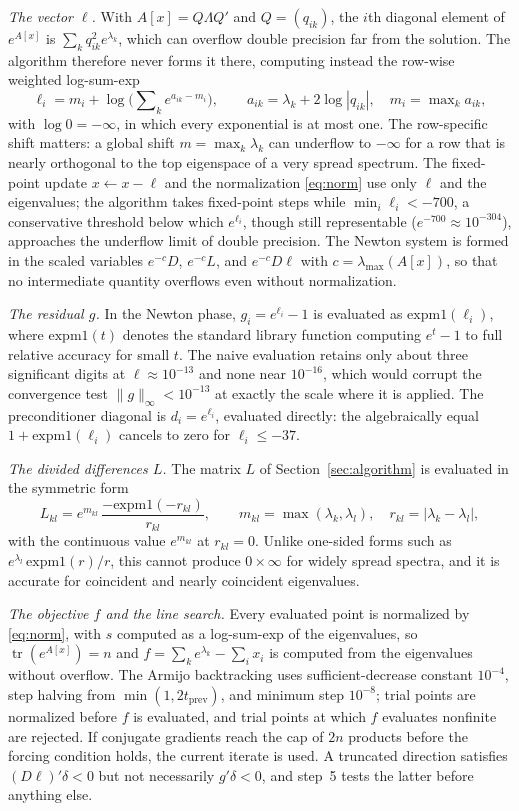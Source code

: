 \documentclass[11pt]{article}
\newcommand{\tr}{\operatorname{tr}}
\begin{document}
\emph{The vector $\ell$.} With $A[x]=Q\Lambda Q'$ and $Q=(q_{ik})$,
the $i$th diagonal element of $e^{A[x]}$ is
$\sum_k q_{ik}^{2}e^{\lambda_k}$, which can overflow double precision
far from the solution. The algorithm therefore never forms it there,
computing instead the row-wise weighted log-sum-exp
\[
\ell_i=m_i+\log\Big(\sum\nolimits_k e^{a_{ik}-m_i}\Big),
\qquad
a_{ik}=\lambda_k+2\log|q_{ik}|,
\quad m_i=\max\nolimits_k a_{ik},
\]
with $\log0=-\infty$, in which every exponential is at most one. The
row-specific shift matters: a global shift $m=\max_k\lambda_k$ can
underflow to $-\infty$ for a row that is nearly orthogonal to the top
eigenspace of a very spread spectrum. The fixed-point update
$x\leftarrow x-\ell$ and the normalization \eqref{eq:norm} use only
$\ell$ and the eigenvalues; the algorithm takes fixed-point steps
while $\min_i\ell_i<-700$, a conservative threshold below which
$e^{\ell_i}$, though still representable
($e^{-700}\approx10^{-304}$), approaches the underflow limit of
double precision. The Newton system is formed in the scaled variables
$e^{-c}D$, $e^{-c}L$, and $e^{-c}D\ell$ with $c=\lambda_{\max}(A[x])$,
so that no intermediate quantity overflows even without
normalization.

\emph{The residual $g$.} In the Newton phase,
$g_i=e^{\ell_i}-1$ is evaluated as $\mathrm{expm1}(\ell_i)$, where
$\mathrm{expm1}(t)$ denotes the standard library function computing
$e^{t}-1$ to full relative accuracy for small $t$. The naive
evaluation retains only about three significant digits at
$\ell\approx10^{-13}$ and none near $10^{-16}$, which would
corrupt the convergence test
$\|g\|_{\infty}<10^{-13}$ at exactly the scale where it is applied.
The preconditioner diagonal is $d_i=e^{\ell_i}$, evaluated directly:
the algebraically equal $1+\mathrm{expm1}(\ell_i)$ cancels to zero
for $\ell_i\leq-37$.

\emph{The divided differences $L$.} The matrix $L$ of
Section~\ref{sec:algorithm} is
evaluated in the symmetric form
\[
L_{kl}=e^{m_{kl}}\,\frac{-\mathrm{expm1}(-r_{kl})}{r_{kl}},
\qquad
m_{kl}=\max(\lambda_k,\lambda_l),\quad r_{kl}=|\lambda_k-\lambda_l|,
\]
with the continuous value $e^{m_{kl}}$ at $r_{kl}=0$. Unlike one-sided
forms such as $e^{\lambda_l}\,\mathrm{expm1}(r)/r$, this cannot
produce $0\times\infty$ for widely spread spectra, and it is accurate
for coincident and nearly coincident eigenvalues.

\emph{The objective $f$ and the line search.} Every evaluated point
is normalized by \eqref{eq:norm}, with $s$ computed as a log-sum-exp
of the eigenvalues, so $\tr(e^{A[x]})=n$ and
$f=\sum_k e^{\lambda_k}-\sum_i x_i$ is computed from the eigenvalues
without overflow. The Armijo backtracking uses sufficient-decrease
constant $10^{-4}$, step halving from $\min(1,2t_{\mathrm{prev}})$,
and minimum step $10^{-8}$; trial points are normalized before $f$ is
evaluated, and trial points at which $f$ evaluates nonfinite are
rejected. If conjugate gradients reach the cap of $2n$ products before
the forcing condition holds, the current iterate is used. A truncated
direction satisfies $(D\ell)'\delta<0$ but not necessarily
$g'\delta<0$, and step~5 tests the latter before anything else.
\end{document}
